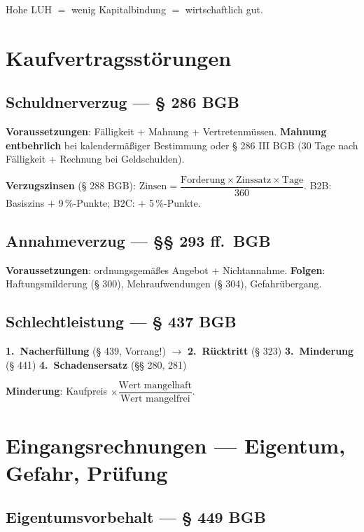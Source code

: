\documentclass[11pt, a4paper]{article}
\begin{document}
Hohe LUH $=$ wenig Kapitalbindung $=$ wirtschaftlich gut.

\section{Kaufvertragsstörungen}

\subsection{Schuldnerverzug --- § 286 BGB}

\textbf{Voraussetzungen}: Fälligkeit + Mahnung + Vertretenmüssen.
\textbf{Mahnung entbehrlich} bei kalendermäßiger Bestimmung oder § 286 III BGB
(30 Tage nach Fälligkeit + Rechnung bei Geldschulden).

\textbf{Verzugszinsen} (§ 288 BGB):
$\text{Zinsen} = \dfrac{\text{Forderung} \times \text{Zinssatz} \times \text{Tage}}{360}$.
B2B: Basiszins $+$ 9\,\%-Punkte; B2C: $+$ 5\,\%-Punkte.

\subsection{Annahmeverzug --- §§ 293 ff.\ BGB}

\textbf{Voraussetzungen}: ordnungsgemäßes Angebot + Nichtannahme.
\textbf{Folgen}: Haftungsmilderung (§ 300), Mehraufwendungen (§ 304), Gefahrübergang.

\subsection{Schlechtleistung --- § 437 BGB}

\begin{merksatz}[title={Käuferrechte-Treppe}]
\textbf{1.\ Nacherfüllung} (§ 439, Vorrang!) $\to$ \textbf{2.\ Rücktritt} (§ 323)
\textbar{} \textbf{3.\ Minderung} (§ 441) \textbar{} \textbf{4.\ Schadensersatz} (§§ 280, 281)
\end{merksatz}

\textbf{Minderung}: Kaufpreis $\times \dfrac{\text{Wert mangelhaft}}{\text{Wert mangelfrei}}$.

\section{Eingangsrechnungen --- Eigentum, Gefahr, Prüfung}

\subsection{Eigentumsvorbehalt --- § 449 BGB}
\end{document}
